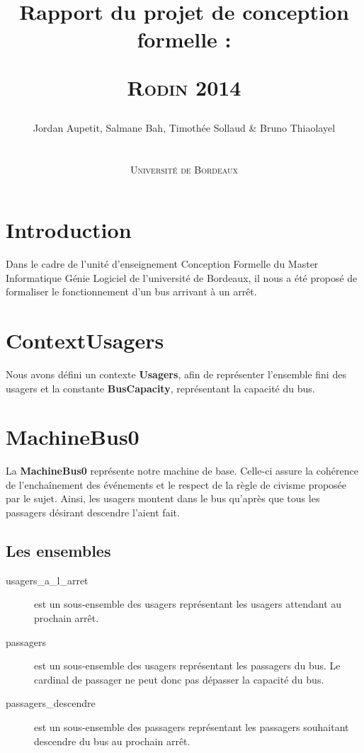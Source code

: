 \documentclass[a4paper,titlepage]{report}
\title{Rapport du projet de conception formelle :
	\begin{center}
		\textsc{Rodin 2014}
	\end{center}
}
\author{Jordan Aupetit, Salmane Bah, Timothée Sollaud \& Bruno Thiaolayel\\
	\\
	\\ \textsc{Université de Bordeaux}
}
\begin{document}
	\maketitle
	\tableofcontents
	\newpage
	\thispagestyle{empty}	
	\newpage
\markboth{}{}
\section{Introduction}
	Dans le cadre de l'unité d'enseignement Conception Formelle du Master Informatique Génie Logiciel de l'université de Bordeaux, il nous a été proposé de formaliser le fonctionnement d'un bus arrivant à un arrêt.



\section{ContextUsagers}
	Nous avons défini un contexte \textbf{Usagers}, afin de représenter l'ensemble fini des usagers et la constante \textbf{BusCapacity}, représentant la capacité du bus.\\

\section{MachineBus0}
	La \textbf{MachineBus0} représente notre machine de base. Celle-ci assure la cohérence de l'enchaînement des événements et le respect de la règle de civisme proposée par le sujet. Ainsi, les usagers montent dans le bus qu'après que tous les passagers désirant descendre l'aient fait.\\
	
	\subsection{Les ensembles}
		\begin{description}
			\item[usagers\_a\_l\_arret] est un sous-ensemble des usagers représentant les usagers attendant au prochain arrêt.\\
			\item[passagers] est un sous-ensemble des usagers représentant les passagers du bus. Le cardinal de passager ne peut donc pas dépasser la capacité du bus.\\
			\item[passagers\_descendre] est un sous-ensemble des passagers représentant les passagers souhaitant descendre du bus au prochain arrêt.\\
		\end{description}
		
\end{document}
